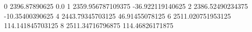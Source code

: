 0 2396.87890625 0.0
1 2359.956787109375 -36.922119140625
2 2386.52490234375 -10.35400390625
4 2443.79345703125 46.91455078125
6 2511.020751953125 114.141845703125
8 2511.34716796875 114.46826171875
